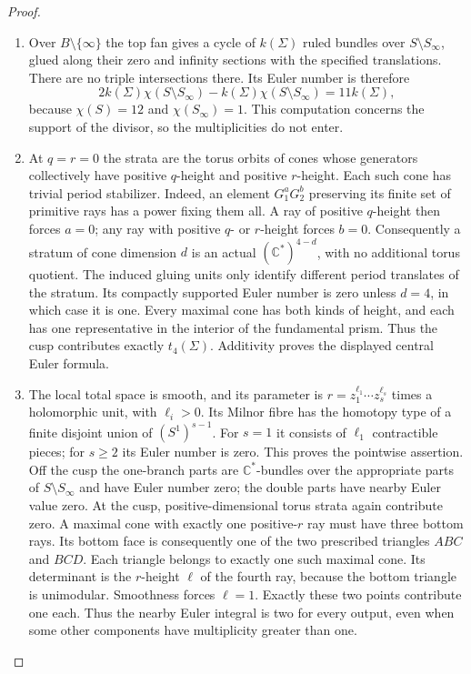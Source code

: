 \begin{proof}
\begin{enumerate}[label=\arabic*.,leftmargin=*]
\item Over $B\setminus\{\infty\}$ the top fan gives a cycle
of $k(\Sigma)$ ruled bundles over
$S\setminus S_\infty$, glued along their zero and
infinity sections with the specified translations.
There are no triple intersections there. Its Euler
number is therefore
\[
 2k(\Sigma)\chi(S\setminus S_\infty)
       -k(\Sigma)\chi(S\setminus S_\infty)
 =11k(\Sigma),
\]
because $\chi(S)=12$ and $\chi(S_\infty)=1$.
This computation concerns the support of the divisor,
so the multiplicities do not enter.

\item At $q=r=0$ the strata are the torus orbits of cones whose
generators collectively have positive $q$-height and
positive $r$-height. Each such cone has trivial period
stabilizer. Indeed, an element $G_1^aG_2^b$ preserving
its finite set of primitive rays has a power fixing them
all. A ray of positive $q$-height then forces $a=0$;
any ray with positive $q$- or $r$-height forces $b=0$.
Consequently a stratum of cone dimension $d$ is an actual
$(\mathbb C^*)^{4-d}$, with no additional torus quotient.
The induced gluing units only identify different period
translates of the stratum. Its compactly supported Euler
number is zero unless $d=4$, in which case it is one.
Every maximal cone has both kinds of height, and each has
one representative in the interior of the fundamental
prism. Thus the cusp contributes exactly $t_4(\Sigma)$.
Additivity proves the displayed central Euler formula.

\item The local total space is smooth, and its parameter is
$r=z_1^{\ell_1}\cdots z_s^{\ell_s}$ times a holomorphic
unit, with $\ell_i>0$. Its Milnor fibre has the homotopy
type of a finite disjoint union of $(S^1)^{s-1}$.
For $s=1$ it consists of $\ell_1$ contractible pieces;
for $s\geq2$ its Euler number is zero. This proves the
pointwise assertion. Off the cusp the one-branch parts
are $\mathbb C^*$-bundles over the appropriate parts of
$S\setminus S_\infty$ and have Euler number zero; the
double parts have nearby Euler value zero. At the cusp,
positive-dimensional torus strata again contribute zero.
A maximal cone with exactly one positive-$r$ ray must
have three bottom rays. Its bottom face is consequently
one of the two prescribed triangles $ABC$ and $BCD$.
Each triangle belongs to exactly one such maximal cone.
Its determinant is the $r$-height $\ell$ of the fourth
ray, because the bottom triangle is unimodular.
Smoothness forces $\ell=1$. Exactly these two points
contribute one each. Thus the nearby Euler integral is
two for every output, even when some other components
have multiplicity greater than one.


\end{enumerate}
\end{proof}
